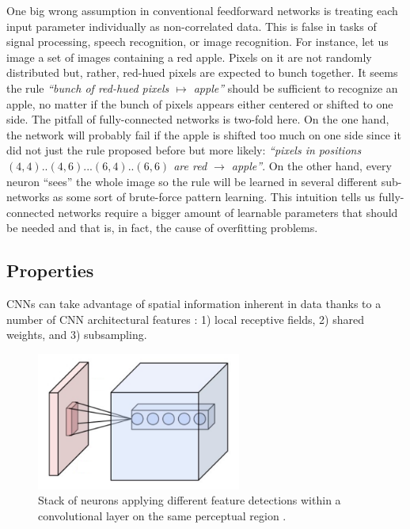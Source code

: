 One big wrong assumption in conventional feedforward networks is treating each input parameter individually as non-correlated data.
This is false in tasks of signal processing, speech recognition, or image recognition.
For instance, let us image a set of images containing a red apple.
Pixels on it are not randomly distributed but, rather, red-hued pixels are expected to bunch together.
It seems the rule \emph{``bunch of red-hued pixels $\mapsto$ apple''} should be sufficient to recognize an apple, no matter if the bunch of pixels appears either centered or shifted to one side.
The pitfall of fully-connected networks is two-fold here.
On the one hand, the network will probably fail if the apple is shifted too much on one side since it did not just the rule proposed before but more likely: \emph{``pixels in positions $(4, 4)..(4, 6)...(6, 4)..(6, 6)$ are red $\rightarrow$ apple''}.
On the other hand, every neuron ``sees'' the whole image so the rule will be learned in several different sub-networks as some sort of brute-force pattern learning.
This intuition tells us fully-connected networks require a bigger amount of learnable parameters that should be needed and that is, in fact, the cause of overfitting problems.


\subsection{Properties}
\label{sub:concepts:convnets:properties}

CNNs can take advantage of spatial information inherent in data thanks to a number of CNN architectural features \cite{LeCun1998}: 1) local receptive fields, 2) shared weights, and 3) subsampling.

\begin{figure}[t]
  \begin{center}
    \includegraphics[width=0.6\textwidth]{gfx/conv-layer-1}
  \end{center}
  \caption{
    Stack of neurons applying different feature detections within a convolutional layer on the same perceptual region \cite{Aphex342015}.
  }
  \label{fig:sec:theory:convnets:conv-layer-1}
\end{figure}

